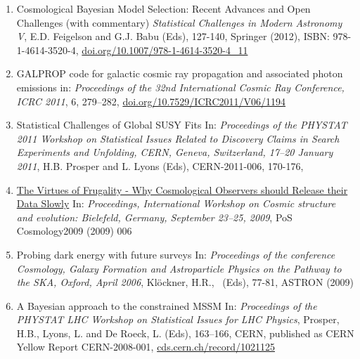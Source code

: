 \begin{enumerate}
\item {}
{Cosmological Bayesian Model Selection: Recent Advances and Open Challenges (with commentary)}
{{\em Statistical Challenges in Modern Astronomy V}, E.D. Feigelson and G.J. Babu (Eds), 127-140, Springer (2012), ISBN: 978-1-4614-3520-4, \href{https://doi.org/10.1007/978-1-4614-3520-4_11}{doi.org/10.1007/978-1-4614-3520-4\_11}}

\item
{}
{GALPROP code for galactic cosmic ray propagation and associated photon emissions}
{in: {\em Proceedings of the 32nd International Cosmic Ray Conference, ICRC 2011}, 6, 279–282, \href{https://doi.org/10.7529/ICRC2011/V06/1194}{doi.org/10.7529/ICRC2011/V06/1194}}

\item 
{}
{Statistical Challenges of Global SUSY Fits}
{In: {\em  Proceedings of the PHYSTAT 2011 Workshop on Statistical Issues Related to Discovery Claims in Search Experiments and Unfolding, CERN, Geneva, Switzerland, 17–20 January 2011}, 
H.B. Prosper and L. Lyons (Eds), CERN-2011-006,  170-176, }

\item
{}
{\href{https://doi.org/10.22323/1.097.0006}{The Virtues of Frugality - Why Cosmological Observers should Release their Data Slowly}}
{In: {\em  Proceedings, International Workshop on Cosmic structure and evolution: Bielefeld, Germany, September 23–25, 2009}, 
PoS Cosmology2009 (2009) 006}


\item 
{}
{Probing dark energy with future surveys}
{In: {\em Proceedings of the conference Cosmology, Galaxy Formation and Astroparticle Physics on the Pathway to the SKA, Oxford, April 2006},  Kl\"ockner, H.R., \etal\ (Eds), 77-81, ASTRON (2009) }

\item 
{}
{A Bayesian approach to the constrained MSSM}
{In: {\em Proceedings of the PHYSTAT LHC Workshop on Statistical Issues for LHC Physics}, Prosper, H.B., Lyons, L. and De Roeck, L. (Eds), 163–166, CERN, published as CERN Yellow Report CERN-2008-001, \href{http://cds.cern.ch/record/1021125}{cds.cern.ch/record/1021125}}
 

\end{enumerate}
